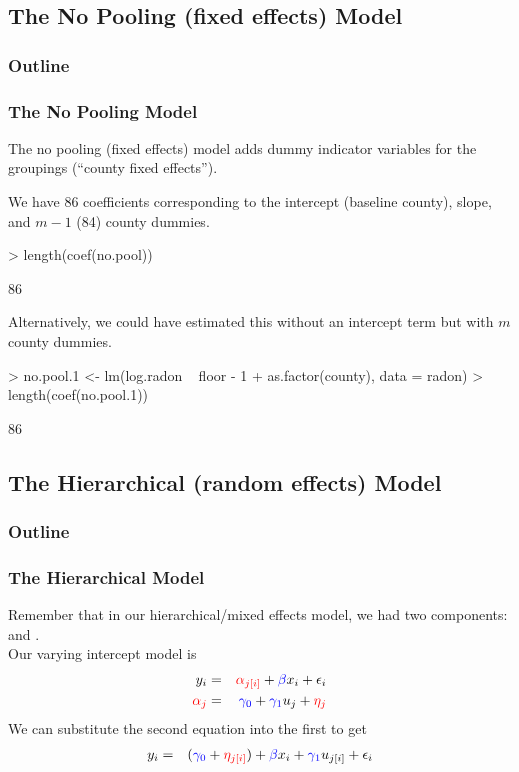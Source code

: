 \documentclass[handout]{beamer}
\begin{document}
\subsection{The No Pooling (fixed effects) Model}

\begin{frame}
\frametitle{Outline}
\tableofcontents[currentsubsection]
\end{frame}

\begin{frame}[fragile]
\frametitle{The No Pooling Model}
\pause
The no pooling (fixed effects) model adds dummy indicator variables
for the groupings (``county fixed effects'').

\bigskip
\pause
We have 86 coefficients corresponding to the intercept (baseline
county), slope, and $m-1$ (84) county dummies.
\tiny
\medskip
\pause
\begin{Schunk}
\begin{Sinput}
> length(coef(no.pool))
\end{Sinput}
\begin{Soutput}
[1] 86
\end{Soutput}
\end{Schunk}
\normalsize
\pause
\bigskip
Alternatively, we could have estimated this without an intercept term
but with $m$ county dummies.
\tiny
\medskip
\pause
\begin{Schunk}
\begin{Sinput}
> no.pool.1 <- lm(log.radon ~ floor - 1 + as.factor(county), data = radon)
> length(coef(no.pool.1))
\end{Sinput}
\begin{Soutput}
[1] 86
\end{Soutput}
\end{Schunk}
\normalsize
\end{frame}

\subsection{The Hierarchical (random effects) Model}

\begin{frame}
\frametitle{Outline}
\tableofcontents[currentsubsection]
\end{frame}

\begin{frame}
\frametitle{The Hierarchical Model}
\pause
Remember that in our hierarchical/mixed effects model, we had two
components:  and .\\
\bigskip
\pause
Our varying intercept model is
\begin{eqnarray*}
y_i &=& \textcolor{red}{\alpha_{j[i]}} + \textcolor{blue}{\beta} x_i + \epsilon_i \\
\textcolor{red}{\alpha_j} &=& \textcolor{blue}{\gamma_0} + \textcolor{blue}{\gamma_1} u_j + \textcolor{red}{\eta_j}
\end{eqnarray*}
\pause
We can substitute the second equation into the first to get
\begin{eqnarray*}
y_i &=& (\textcolor{blue}{\gamma_0} + \textcolor{red}{\eta_{j[i]}}) + \textcolor{blue}{\beta} x_i  +
\textcolor{blue}{\gamma_1} u_{j[i]} + \epsilon_i
\end{eqnarray*}
\end{frame}
\end{document}
